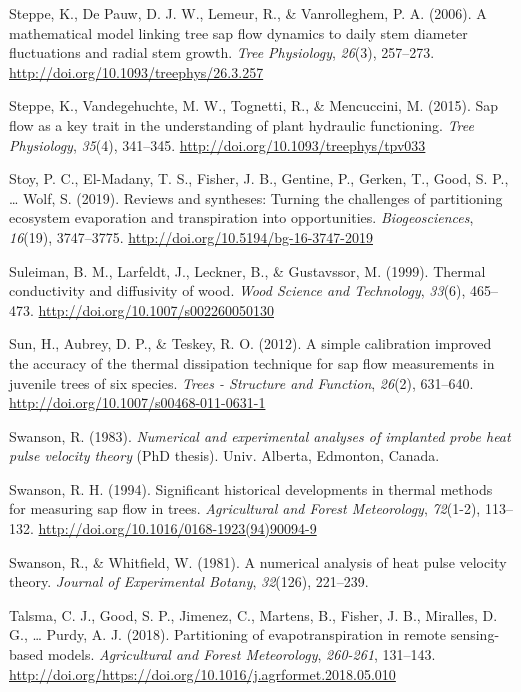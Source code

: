 \documentclass[11pt,twoside]{reedthesis}
\begin{document}
\hypertarget{ref-Steppe2006}{}
Steppe, K., De Pauw, D. J. W., Lemeur, R., \& Vanrolleghem, P. A.
(2006). A mathematical model linking tree sap flow dynamics to daily
stem diameter fluctuations and radial stem growth. \emph{Tree
Physiology}, \emph{26}(3), 257--273.
\url{http://doi.org/10.1093/treephys/26.3.257}

\hypertarget{ref-Steppe2015}{}
Steppe, K., Vandegehuchte, M. W., Tognetti, R., \& Mencuccini, M.
(2015). Sap flow as a key trait in the understanding of plant hydraulic
functioning. \emph{Tree Physiology}, \emph{35}(4), 341--345.
\url{http://doi.org/10.1093/treephys/tpv033}

\hypertarget{ref-Stoy2019}{}
Stoy, P. C., El-Madany, T. S., Fisher, J. B., Gentine, P., Gerken, T.,
Good, S. P., \ldots{} Wolf, S. (2019). Reviews and syntheses: Turning
the challenges of partitioning ecosystem evaporation and transpiration
into opportunities. \emph{Biogeosciences}, \emph{16}(19), 3747--3775.
\url{http://doi.org/10.5194/bg-16-3747-2019}

\hypertarget{ref-Suleiman1999}{}
Suleiman, B. M., Larfeldt, J., Leckner, B., \& Gustavssor, M. (1999).
Thermal conductivity and diffusivity of wood. \emph{Wood Science and
Technology}, \emph{33}(6), 465--473.
\url{http://doi.org/10.1007/s002260050130}

\hypertarget{ref-Sun2012}{}
Sun, H., Aubrey, D. P., \& Teskey, R. O. (2012). A simple calibration
improved the accuracy of the thermal dissipation technique for sap flow
measurements in juvenile trees of six species. \emph{Trees - Structure
and Function}, \emph{26}(2), 631--640.
\url{http://doi.org/10.1007/s00468-011-0631-1}

\hypertarget{ref-Swanson1983}{}
Swanson, R. (1983). \emph{Numerical and experimental analyses of
implanted probe heat pulse velocity theory} (PhD thesis). Univ. Alberta,
Edmonton, Canada.

\hypertarget{ref-Swanson1994}{}
Swanson, R. H. (1994). Significant historical developments in thermal
methods for measuring sap flow in trees. \emph{Agricultural and Forest
Meteorology}, \emph{72}(1-2), 113--132.
\url{http://doi.org/10.1016/0168-1923(94)90094-9}

\hypertarget{ref-Swanson1981}{}
Swanson, R., \& Whitfield, W. (1981). A numerical analysis of heat pulse
velocity theory. \emph{Journal of Experimental Botany}, \emph{32}(126),
221--239.

\hypertarget{ref-Talsma2018}{}
Talsma, C. J., Good, S. P., Jimenez, C., Martens, B., Fisher, J. B.,
Miralles, D. G., \ldots{} Purdy, A. J. (2018). Partitioning of
evapotranspiration in remote sensing-based models. \emph{Agricultural
and Forest Meteorology}, \emph{260-261}, 131--143.
\url{http://doi.org/https://doi.org/10.1016/j.agrformet.2018.05.010}
\end{document}
